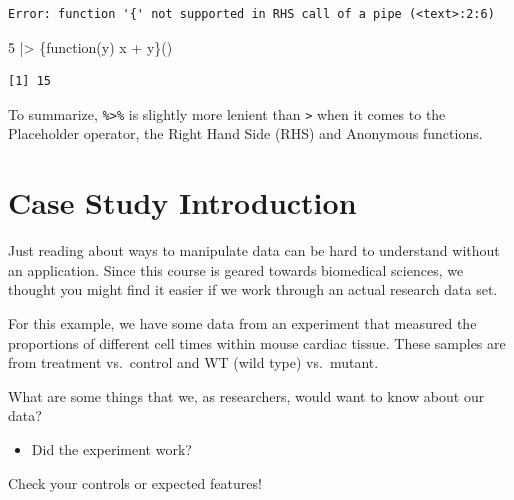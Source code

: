 \documentclass[
  letterpaper,
  DIV=11,
  numbers=noendperiod]{scrreprt}
\newenvironment{Shaded}{\begin{snugshade}}{\end{snugshade}}
\newcommand{\ControlFlowTok}[1]{\textcolor[rgb]{0.00,0.23,0.31}{#1}}
\newcommand{\DecValTok}[1]{\textcolor[rgb]{0.68,0.00,0.00}{#1}}
\newcommand{\NormalTok}[1]{\textcolor[rgb]{0.00,0.23,0.31}{#1}}
\newcommand{\SpecialCharTok}[1]{\textcolor[rgb]{0.37,0.37,0.37}{#1}}
\providecommand{\tightlist}{%
  \setlength{\itemsep}{0pt}\setlength{\parskip}{0pt}}\usepackage{longtable,booktabs,array}
\begin{document}
\begin{tcolorbox}
\begin{tcolorbox}
\begin{verbatim}
Error: function '{' not supported in RHS call of a pipe (<text>:2:6)
\end{verbatim}

\begin{Shaded}
\begin{Highlighting}[]
\DecValTok{5} \SpecialCharTok{|\textgreater{}}\NormalTok{ \{}\ControlFlowTok{function}\NormalTok{(y) x }\SpecialCharTok{+}\NormalTok{ y\}()}
\end{Highlighting}
\end{Shaded}

\begin{verbatim}
[1] 15
\end{verbatim}

\end{tcolorbox}

To summarize, \texttt{\%\textgreater{}\%} is slightly more lenient than
\texttt{\textbar{}\textgreater{}} when it comes to the Placeholder
operator, the Right Hand Side (RHS) and Anonymous functions.

\end{tcolorbox}

\section{Case Study Introduction}\label{case-study-introduction}

Just reading about ways to manipulate data can be hard to understand
without an application. Since this course is geared towards biomedical
sciences, we thought you might find it easier if we work through an
actual research data set.

For this example, we have some data from an experiment that measured the
proportions of different cell times within mouse cardiac tissue. These
samples are from treatment vs.~control and WT (wild type) vs.~mutant.

What are some things that we, as researchers, would want to know about
our data?

\begin{itemize}
\tightlist
\item
  Did the experiment work?
\end{itemize}

\begin{tcolorbox}[enhanced jigsaw, bottomtitle=1mm, bottomrule=.15mm, toprule=.15mm, opacityback=0, leftrule=.75mm, breakable, colback=white, toptitle=1mm, left=2mm, coltitle=black, titlerule=0mm, opacitybacktitle=0.6, title=\textcolor{quarto-callout-note-color}{\faInfo}\hspace{0.5em}{Things to consider:}, rightrule=.15mm, arc=.35mm, colframe=quarto-callout-note-color-frame, colbacktitle=quarto-callout-note-color!10!white]

Check your controls or expected features!

\end{tcolorbox}
\end{document}
